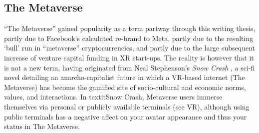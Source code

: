 \subsection{The Metaverse}\label{sec: theory-space-metaverse}
“The Metaverse” gained popularity as a term partway through this writing thesis, partly due to Facebook’s calculated re-brand to Meta, partly due to the resulting ‘bull’ run in “metaverse” cryptocurrencies, and partly due to the large subsequent increase of venture capital funding in XR start-ups. The reality is however that it is not a new term, having originated from Neal Stephenson’s \textit{Snow Crash} \citep[]{stephenson1992}, a sci-fi novel detailing an anarcho-capitalist future in which a VR-based internet (The Metaverse) has become the gamified site of socio-cultural and economic norms, values, and interactions. In textit{Snow Crash}, Metaverse users immerse themselves via personal or publicly available terminals (see VR), although using public terminals has a negative affect on your avatar appearance and thus your status in The Metaverse.

